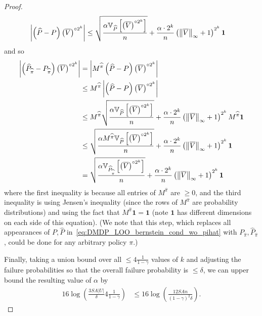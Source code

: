 \documentclass{article}
\theoremstyle{plain}
\theoremstyle{plain}
\theoremstyle{remark}
\theoremstyle{plain}
\theoremstyle{plain}
\newcommand{\Var}{\mathbb{V}}
\newcommand{\Phat}{\widehat{P}}
\newcommand{\one}{\mathbf{1}}
\newcommand{\pihat}{\widehat{\pi}}
\newcommand{\Vc}{\overline{V}}
\begin{document}
\begin{proof}
\begin{align}
    \left| \left(\Phat - P\right) \left( \Vc \right)^{\circ 2^k} \right| & \leq \sqrt{\frac{\alpha  \Var_{\Phat} \left[ \left(\Vc \right)^{\circ 2^k}  \right]    }{n }} + \frac{ \alpha \cdot 2^k }{n}  \left( \infnorm{\Vc} + 1\right)^{2^k} \one \label{eq:DMDP_LOO_bernstein_cond_wo_pihat}
\end{align}
and so
\begin{align}
    \left| \left(\Phat_{\pihat} - P_{\pihat}\right) \left( \Vc \right)^{\circ 2^k} \right| &= \left|M^{\pihat} \left(\Phat - P\right) \left( \Vc \right)^{\circ 2^k} \right|  \nonumber \\
    & \leq M^{\pihat} \left| \left(\Phat - P\right) \left( \Vc \right)^{\circ 2^k} \right| \nonumber \\
    & \leq M^{\pihat} \sqrt{\frac{\alpha  \Var_{\Phat} \left[ \left(\Vc \right)^{\circ 2^k}  \right]    }{n }} + \frac{ \alpha \cdot 2^k }{n}  \left( \infnorm{\Vc} + 1\right)^{2^k}  M^{\pihat} \one \nonumber \\
    & \leq  \sqrt{\frac{\alpha  M^{\pihat} \Var_{\Phat} \left[ \left(\Vc \right)^{\circ 2^k}  \right]    }{n }} + \frac{ \alpha \cdot 2^k }{n}  \left( \infnorm{\Vc} + 1\right)^{2^k}   \one \nonumber \\
    &= \sqrt{\frac{\alpha   \Var_{\Phat_{\pihat}} \left[ \left(\Vc \right)^{\circ 2^k}  \right]    }{n }} + \frac{ \alpha \cdot 2^k }{n}  \left( \infnorm{\Vc} + 1\right)^{2^k}   \one \label{eq:DMDP_LOO_bernstein_cond_add_pihat}
\end{align}
where the first inequality is because all entries of $M^{\pihat}$ are $\geq 0$, and the third inequality is using Jensen's inequality (since the rows of $M^{\pihat}$ are probability distributions) and using the fact that $M^{\pihat} \one = \one$ (note $\one$ has different dimensions on each side of this equation). (We note that this step, which replaces all appearances of $P, \Phat$ in~\eqref{eq:DMDP_LOO_bernstein_cond_wo_pihat} with $P_{\pihat}, \Phat_{\pihat}$, could be done for any arbitrary policy $\pi$.)

Finally, taking a union bound over all $\leq 4 \frac{1}{1-\gamma}$ values of $k$ and adjusting the failure probabilities so that the overall failure probability is $\leq \delta$, we can upper bound the resulting value of $\alpha$ by
\begin{align}
    16 \log \left(\frac{3 SA |U|}{\delta} 4 \frac{1}{1-\gamma} \right) & \leq 16 \log \left(\frac{12 SA n}{(1-\gamma)^2\delta} \right). \label{eq:DMDP_LOO_bernstein_alpha_bound}
\end{align}
\end{proof}
\end{document}
